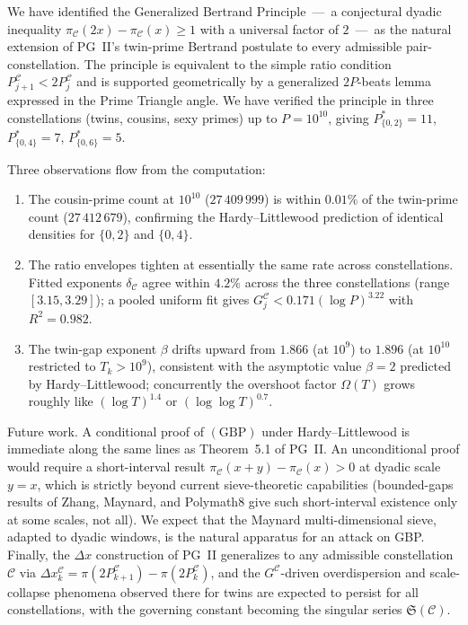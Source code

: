 \documentclass[11pt]{article}
\begin{document}
We have identified the Generalized Bertrand Principle~---~a
conjectural dyadic inequality $\pi_\mathcal{C}(2x)-\pi_\mathcal{C}(x)
\ge 1$ with a universal factor of $2$~---~as the natural
extension of PG~II's twin-prime Bertrand postulate to every
admissible pair-constellation. The principle is equivalent to the
simple ratio condition $P^{\mathcal{C}}_{j+1}<2P^{\mathcal{C}}_j$ and
is supported geometrically by a generalized $2P$-beats lemma
expressed in the Prime Triangle angle. We have verified the
principle in three constellations (twins, cousins, sexy primes) up
to $P=10^{10}$, giving $P^{*}_{\{0,2\}}=11$, $P^{*}_{\{0,4\}}=7$,
$P^{*}_{\{0,6\}}=5$.

Three observations flow from the computation:
\begin{enumerate}
\item The cousin-prime count at $10^{10}$ ($27\,409\,999$) is
within $0.01\%$ of the twin-prime count ($27\,412\,679$), confirming
the Hardy--Littlewood prediction of identical densities for
$\{0,2\}$ and $\{0,4\}$.
\item The ratio envelopes tighten at essentially the same rate
across constellations. Fitted exponents $\delta_\mathcal{C}$ agree
within $4.2\%$ across the three constellations
(range $[3.15,3.29]$); a pooled uniform fit gives
$G^{\mathcal{C}}_j<0.171(\log P)^{3.22}$ with $R^2=0.982$.
\item The twin-gap exponent $\beta$ drifts upward from
$1.866$ (at $10^9$) to $1.896$ (at $10^{10}$ restricted to
$T_k>10^9$), consistent with the asymptotic value $\beta=2$ predicted
by Hardy--Littlewood; concurrently the overshoot factor $\Omega(T)$
grows roughly like $(\log T)^{1.4}$ or $(\log\log T)^{0.7}$.
\end{enumerate}

Future work. A conditional proof of $(\mathrm{GBP})$ under
Hardy--Littlewood is immediate along the same lines as
Theorem~5.1 of PG~II. An unconditional proof would require a
short-interval result
$\pi_\mathcal{C}(x+y)-\pi_\mathcal{C}(x)>0$ at dyadic scale $y=x$,
which is strictly beyond current sieve-theoretic capabilities
(bounded-gaps results of Zhang, Maynard, and Polymath8 give such
short-interval existence only at some scales, not all). We expect
that the Maynard multi-dimensional sieve, adapted to dyadic
windows, is the natural apparatus for an attack on GBP. Finally, the
$\Delta x$ construction of PG~II generalizes to any admissible
constellation $\mathcal{C}$ via
$\Delta x^{\mathcal{C}}_k=\pi(2P^{\mathcal{C}}_{k+1})-\pi(2P^{\mathcal{C}}_k)$,
and the $G^{\mathcal{C}}$-driven overdispersion and scale-collapse
phenomena observed there for twins are expected to persist for all
constellations, with the governing constant becoming the singular
series $\mathfrak{S}(\mathcal{C})$.
\end{document}
